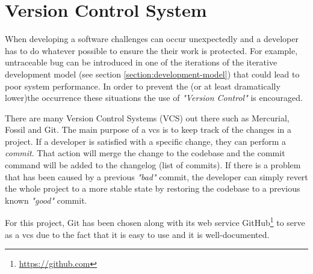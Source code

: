 \section{Version Control System}
When developing a software challenges can occur unexpectedly and a developer has to do whatever possible to ensure the their work is protected. For example, untraceable bug can be introduced in one of the iterations of the iterative development model (see section \ref{section:development-model}) that could lead to poor system performance. In order to prevent the (or at least dramatically lower)the occurrence these situations the use of \textit{"Version Control"} is encouraged.

There are many Version Control Systems (VCS) out there such as Mercurial, Fossil and Git. The main purpose of a \gls{vcs} is to keep track of the changes in a project. If a developer is satisfied with a specific change, they can perform a \textit{commit}. That action will merge the change to the codebase and the commit command will be added to the changelog (list of commits). If there is a problem that has been caused by a previous \textit{"bad"} commit, the developer can simply revert the whole project to a more stable state by restoring the codebase to a previous known \textit{"good"} commit.

For this project, Git has been chosen along with its web service GitHub\footnote{\url{https://github.com}} to serve as a \gls{vcs} due to the fact that it is easy to use and it is well-documented.

